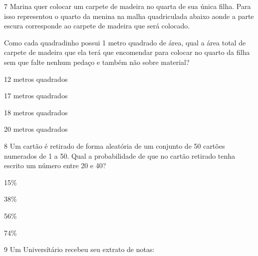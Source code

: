 \num{7} Marina quer colocar um carpete de madeira no quarta de sua única
filha. Para isso representou o quarto da menina na malha quadriculada
abaixo aonde a parte escura corresponde ao carpete de madeira que será
colocado.


Como cada quadradinho possui 1 metro quadrado de área, qual a área total
de carpete de madeira que ela terá que encomendar para colocar no quarto
da filha sem que falte nenhum pedaço e também não sobre material?

\begin{escolha}
\item
  12 metros quadrados
\item
  17 metros quadrados
\item
  18 metros quadrados
\item
  20 metros quadrados
\end{escolha}


\num{8} Um cartão é retirado de forma aleatória de um conjunto de 50
cartões numerados de 1 a 50. Qual a probabilidade de que no cartão
retirado tenha escrito um número entre 20 e 40?

\begin{escolha}
\item
  15\%
\item
  38\%
\item
  56\%
\item
  74\%
\end{escolha}


\num{9} Um Universítário recebeu seu extrato de notas:


